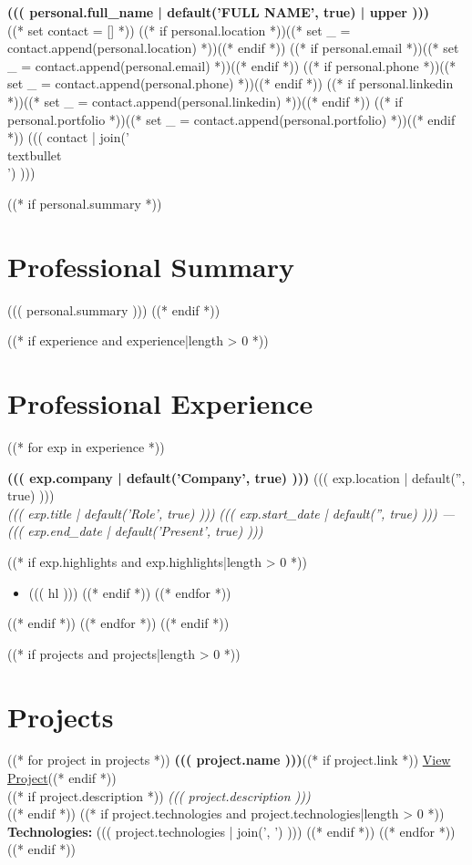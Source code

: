 \documentclass[11pt,a4paper]{article}
\newcommand{\resumeSubheading}[4]{
  \noindent\textbf{#1} \hfill #2 \\
  \textit{#3} \hfill \textit{#4}
  \vspace{2pt}
}
\begin{document}
\begin{center}
  {\LARGE\bfseries ((( personal.full_name | default('FULL NAME', true) | upper )))}\\[6pt]
  {\small\color{muted}
    ((* set contact = [] *))
    ((* if personal.location *))((* set _ = contact.append(personal.location) *))((* endif *))
    ((* if personal.email *))((* set _ = contact.append(personal.email) *))((* endif *))
    ((* if personal.phone *))((* set _ = contact.append(personal.phone) *))((* endif *))
    ((* if personal.linkedin *))((* set _ = contact.append(personal.linkedin) *))((* endif *))
    ((* if personal.portfolio *))((* set _ = contact.append(personal.portfolio) *))((* endif *))
    ((( contact | join(' \\textbullet\\ ') )))
  }
\end{center}

((* if personal.summary *))
\section{Professional Summary}
((( personal.summary )))
((* endif *))

((* if experience and experience|length > 0 *))
\section{Professional Experience}
((* for exp in experience *))
\resumeSubheading
  {((( exp.company | default('Company', true) )))}{((( exp.location | default('', true) )))}
  {((( exp.title | default('Role', true) )))}{((( exp.start_date | default('', true) ))) --- ((( exp.end_date | default('Present', true) )))}
((* if exp.highlights and exp.highlights|length > 0 *))
\begin{itemize}[leftmargin=16pt, itemsep=2pt, parsep=0pt, topsep=4pt]
((* for hl in exp.highlights *))
((* if hl *))
  \item ((( hl )))
((* endif *))
((* endfor *))
\end{itemize}
((* endif *))
\vspace{6pt}
((* endfor *))
((* endif *))

((* if projects and projects|length > 0 *))
\section{Projects}
((* for project in projects *))
\noindent\textbf{((( project.name )))}((* if project.link *)) \hfill {\small\href{((* if 'http' not in project.link *))https://((* endif *))((( project.link )))}{View Project}}((* endif *))\\
((* if project.description *))
{\small\textit{((( project.description )))}}\\
((* endif *))
((* if project.technologies and project.technologies|length > 0 *))
{\small\textbf{Technologies:} ((( project.technologies | join(', ') )))}
((* endif *))
\vspace{6pt}
((* endfor *))
((* endif *))
\end{document}
